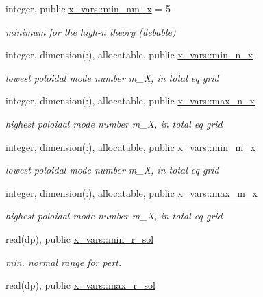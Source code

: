 \begin{DoxyCompactItemize}
integer, public \hyperlink{namespacex__vars_adec89f548ba63e203297222dce675b94}{x\+\_\+vars\+::min\+\_\+nm\+\_\+x} = 5
\begin{DoxyCompactList}\small\item\em minimum for the high-\/n theory (debable) \end{DoxyCompactList}\item 
integer, dimension(\+:), allocatable, public \hyperlink{namespacex__vars_a07485e5ebf54c236ae6f3c25e9cd2a93}{x\+\_\+vars\+::min\+\_\+n\+\_\+x}
\begin{DoxyCompactList}\small\item\em lowest poloidal mode number {\ttfamily m\+\_\+X}, in total eq grid \end{DoxyCompactList}\item 
integer, dimension(\+:), allocatable, public \hyperlink{namespacex__vars_a2f04400f8c1489db3f2d66fa972852a5}{x\+\_\+vars\+::max\+\_\+n\+\_\+x}
\begin{DoxyCompactList}\small\item\em highest poloidal mode number {\ttfamily m\+\_\+X}, in total eq grid \end{DoxyCompactList}\item 
integer, dimension(\+:), allocatable, public \hyperlink{namespacex__vars_aae62c7b4f8043dcccad97454b5857690}{x\+\_\+vars\+::min\+\_\+m\+\_\+x}
\begin{DoxyCompactList}\small\item\em lowest poloidal mode number {\ttfamily m\+\_\+X}, in total eq grid \end{DoxyCompactList}\item 
integer, dimension(\+:), allocatable, public \hyperlink{namespacex__vars_aad66540f255243f66887442b9ef3c745}{x\+\_\+vars\+::max\+\_\+m\+\_\+x}
\begin{DoxyCompactList}\small\item\em highest poloidal mode number {\ttfamily m\+\_\+X}, in total eq grid \end{DoxyCompactList}\item 
real(dp), public \hyperlink{namespacex__vars_a50c610efcf5afa4ec4b0eb7119b5d520}{x\+\_\+vars\+::min\+\_\+r\+\_\+sol}
\begin{DoxyCompactList}\small\item\em min. normal range for pert. \end{DoxyCompactList}\item 
real(dp), public \hyperlink{namespacex__vars_a0f45dfddb928623424eeb8b8bdd2b0f9}{x\+\_\+vars\+::max\+\_\+r\+\_\+sol}

\end{DoxyCompactItemize}
